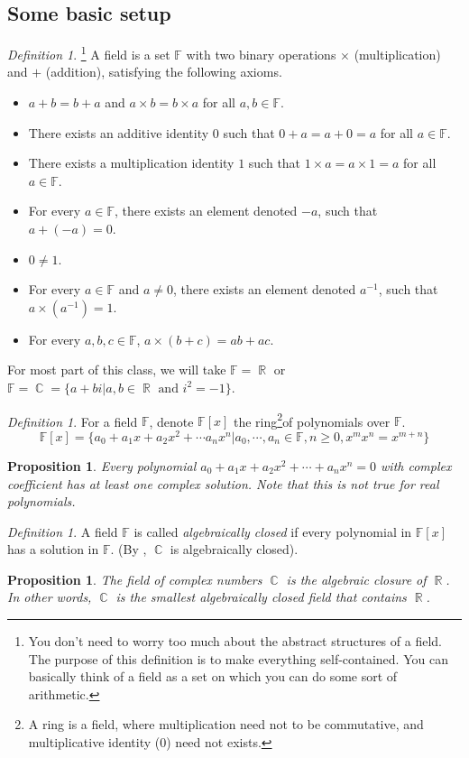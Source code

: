 \documentclass[12pt]{amsart}
\newcommand{\fff}[0]{\mathbb{F}}
\renewcommand{\geq}{\geqslant}
\DeclareMathOperator{\rr}{\mathbb{R}}
\DeclareMathOperator{\cc}{\mathbb{C}}
\newtheorem{proposition}[theorem]{Proposition}
\theoremstyle{remark}
\newtheorem{definition}[theorem]{Definition}
\numberwithin{equation}{section}
\begin{document}
\subsection{Some basic setup}
\begin{definition}\footnote{You don't need to worry too much about the abstract structures of a field. The purpose of this definition is to make everything self-contained. You can basically think of a field as a set on which you can do some sort of arithmetic.}
	A field is a set $\fff$ with two binary operations $\times$ (multiplication) and $+$ (addition), satisfying the following axioms.
	\begin{itemize}
	    \item $a+b=b+a$ and $a\times b = b\times a$ for all $a,b\in\fff$.
		\item There exists an additive identity $0$ such that $0+a=a+0 = a$ for all $a\in\fff$.
		\item There exists a multiplication identity $1$ such that $1\times a= a\times 1=a$ for all $a\in\fff$.
		\item For every $a\in\fff$, there exists an element denoted $-a$, such that $a+(-a)=0$.
		\item $0\neq 1$.
		\item For every $a\in\fff$ and $a\neq 0$, there exists an element denoted $a^{-1}$, such that $a\times (a^{-1})=1$.
		\item For every $a,b,c\in\fff$, $a\times (b+c)=ab+ac$.
	\end{itemize}
For most part of this class, we will take $\fff=\rr $  or $\fff=\cc=\{a+bi|a,b\in\rr\text{ and }i^2 = -1\}$.
\end{definition}
\begin{definition}
	For a field $\fff$, denote $\fff[x]$ the ring\footnote{A ring is a field, where multiplication need not to be commutative, and multiplicative identity ($0$) need not exists.}of polynomials over $\fff$. 
	\[\fff[x]=\{a_0+a_1x+a_2x^2+\cdots a_nx^n|a_0,\cdots,a_n\in \fff,n\geq 0, x^mx^n=x^{m+n}\}\]\end{definition} 
\begin{proposition}\label{prop:C_alg_close}
	Every polynomial $a_0+a_1x+a_2x^2+\cdots+a_nx^n = 0$ with complex coefficient has at least one complex solution. Note that this is not true for real polynomials.
\end{proposition}
\begin{definition}
	A field $\fff$ is called \emph{algebraically closed} if every polynomial in $\fff[x]$ has a solution in $\fff$. (By , $\cc$ is algebraically closed).
\end{definition}
\begin{proposition}
	The field of complex numbers $\cc$ is the algebraic closure of $\rr$. In other words, $\cc$ is the smallest algebraically closed field that contains $\rr$.
\end{proposition}
\end{document}
